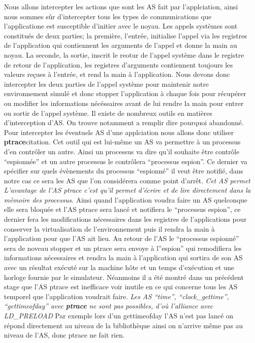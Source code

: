 Nous allons intercepter les actions que sont les AS fait par l'applciation, ainsi
nous sommes sûr d'intercepter tous les types de communications que
l'applicatione est susceptible d'initier avec le noyau. Les appels systèmes sont constitués de deux parties; la première, l'entrée, initialise l'appel via les registres de l'application qui contiennent les arguments de l'appel et donne la main au noyau. La seconde, la sortie, inscrit le reotur de l'appel système dans le registre de retour de l'application, les registres d'arguments contiennent toujours les valeurs reçues à l'entrée, et rend la main à l'application. Nous devons donc intercepter les deux parties de l'appel système pour maintenir notre environnement simulé et donc stopper l'application à chaque fois pour récupérer ou modifier les informations nécéssaires avant de lui rendre la main pour entrer ou sortir de l'appel système. Il existe de nombreux outils
en matières d'interception d'AS. On trouve notamment {\color{green} a remplir
  dire pourquoi abandonné}. Pour intercepter les éventuels AS d'une applciation
nous allons donc utiliser \textbf{ptrace}{\color{red}citation}. Cet outil qui
est lui-même un AS va permettre à un processus d'en contrôler un autre. Ainsi un
processus va dire qu'il souhaite être contrôle ``espionnée'' et un autre
processus le contrôlera ``processus espion''. Ce dernier va spécifier sur quels
évènements du processus ``espionné'' il veut être notifié, dans notre cas ce
sera les AS que l'on considérera comme point d'arrêt. \textit{Cet AS permet
  L'avantage de l'AS ptrace c'est qu'il permet d'écrire et de lire directement
  dans la mémoire des processus.} Ainsi quand l'application voudra faire un AS
quelconque elle sera bloquée et l'AS ptrace sera lancé et notifiera le
``processus espion'', ce dernier fera les modifications nécessaires dans les
registres de l'applications pour conserver la virtualisation de l'environnement
puis il rendra la main à l'application pour que l'AS ait lieu. Au retour de l'AS
le ``processus espionné'' sera de noveau stopper et un ptrace sera envoye à
l''espion'' qui remodifiera les informations nécessaires et rendra la main à
l'application qui sortira de son AS avec un résultat exécuté sur la machine hôte
et un temps d'exécution et une horloge fournie par le simulateur. Néanmoins il a
été montré dans un précédent stage que l'AS ptrace est inefficace voir inutile
en ce qui concerne tous les AS temporel que l'application voudrait
faire. \textit{Les AS ``time'', ``clock\_gettime'', ``gettimeofday'' avec
  \textbf{ptrace} ne sont pas possibles, d'où l'alliance avec LD\_PRELOAD} Par
exemple lors d'un gettimeofday l'AS n'est pas lancé on répond directement au
niveau de la bibliothèque ainsi on n'arrive même pas au niveau de l'AS, donc
ptrace ne fait rien.

